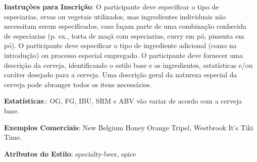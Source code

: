 \textbf{Instruções para Inscrição}: O participante deve especificar o tipo de especiarias, ervas ou vegetais utilizados, mas ingredientes individuais não necessitam serem especificados, caso façam parte de uma combinação conhecida de especiarias (p. ex., torta de maçã com especiarias, curry em pó, pimenta em pó). O participante deve especificar o tipo de ingrediente adicional (como na introdução) ou processo especial empregado. O participante deve fornecer uma descrição da cerveja, identificando o estilo base e os ingredientes, estatísticas e/ou caráter desejado para a cerveja. Uma descrição geral da natureza especial da cerveja pode abranger todos os itens necessários.

\textbf{Estatísticas}:: OG, FG, IBU, SRM e ABV vão variar de acordo com a cerveja base.

\textbf{Exemplos Comerciais}: New Belgium Honey Orange Tripel, Westbrook It's Tiki Time.

\textbf{Atributos do Estilo}: specialty-beer, spice
